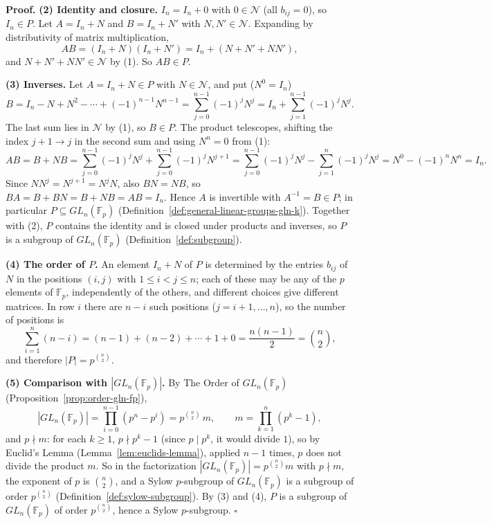 \documentclass[11pt]{report}
\renewenvironment{proof}[1][Proof]{\noindent\textbf{#1.} }{\hfill$\square$\par\vspace{5pt}}
\begin{document}
\begin{proof}
\textbf{(2) Identity and closure.} $I_n = I_n + 0$ with $0 \in \mathcal{N}$ (all $b_{ij} = 0$), so $I_n \in P$. Let $A = I_n + N$ and $B = I_n + N'$ with $N, N' \in \mathcal{N}$. Expanding by distributivity of matrix multiplication,
\[ AB = (I_n + N)(I_n + N') = I_n + (N + N' + NN'), \]
and $N + N' + NN' \in \mathcal{N}$ by (1). So $AB \in P$.

\textbf{(3) Inverses.} Let $A = I_n + N \in P$ with $N \in \mathcal{N}$, and put ($N^0 = I_n$)
\[ B = I_n - N + N^2 - \cdots + (-1)^{n-1} N^{n-1} = \sum_{j=0}^{n-1} (-1)^j N^j = I_n + \sum_{j=1}^{n-1} (-1)^j N^j. \]
The last sum lies in $\mathcal{N}$ by (1), so $B \in P$. The product telescopes, shifting the index $j + 1 \to j$ in the second sum and using $N^n = 0$ from (1):
\[ AB = B + NB = \sum_{j=0}^{n-1} (-1)^j N^j + \sum_{j=0}^{n-1} (-1)^j N^{j+1} = \sum_{j=0}^{n-1} (-1)^j N^j - \sum_{j=1}^{n} (-1)^j N^j = N^0 - (-1)^n N^n = I_n. \]
Since $N N^j = N^{j+1} = N^j N$, also $BN = NB$, so $BA = B + BN = B + NB = AB = I_n$. Hence $A$ is invertible with $A^{-1} = B \in P$; in particular $P \subseteq GL_n(\mathbb{F}_p)$ (Definition~\ref{def:general-linear-groups-gln-k}). Together with (2), $P$ contains the identity and is closed under products and inverses, so $P$ is a subgroup of $GL_n(\mathbb{F}_p)$ (Definition~\ref{def:subgroup}).

\textbf{(4) The order of $P$.} An element $I_n + N$ of $P$ is determined by the entries $b_{ij}$ of $N$ in the positions $(i, j)$ with $1 \leq i < j \leq n$; each of these may be any of the $p$ elements of $\mathbb{F}_p$, independently of the others, and different choices give different matrices. In row $i$ there are $n - i$ such positions ($j = i + 1, \ldots, n$), so the number of positions is
\[ \sum_{i=1}^{n} (n - i) = (n - 1) + (n - 2) + \cdots + 1 + 0 = \frac{n(n-1)}{2} = \binom{n}{2}, \]
and therefore $|P| = p^{\binom{n}{2}}$.

\textbf{(5) Comparison with $|GL_n(\mathbb{F}_p)|$.} By The Order of $GL_n(\mathbb{F}_p)$ (Proposition~\ref{prop:order-gln-fp}),
\[ |GL_n(\mathbb{F}_p)| = \prod_{i=0}^{n-1} (p^n - p^i) = p^{\binom{n}{2}}\, m, \qquad m = \prod_{k=1}^{n} (p^k - 1), \]
and $p \nmid m$: for each $k \geq 1$, $p \nmid p^k - 1$ (since $p \mid p^k$, it would divide $1$), so by Euclid's Lemma (Lemma~\ref{lem:euclids-lemma}), applied $n - 1$ times, $p$ does not divide the product $m$. So in the factorization $|GL_n(\mathbb{F}_p)| = p^{\binom{n}{2}} m$ with $p \nmid m$, the exponent of $p$ is $\binom{n}{2}$, and a Sylow $p$-subgroup of $GL_n(\mathbb{F}_p)$ is a subgroup of order $p^{\binom{n}{2}}$ (Definition~\ref{def:sylow-subgroup}). By (3) and (4), $P$ is a subgroup of $GL_n(\mathbb{F}_p)$ of order $p^{\binom{n}{2}}$, hence a Sylow $p$-subgroup.
\end{proof}
\end{document}

